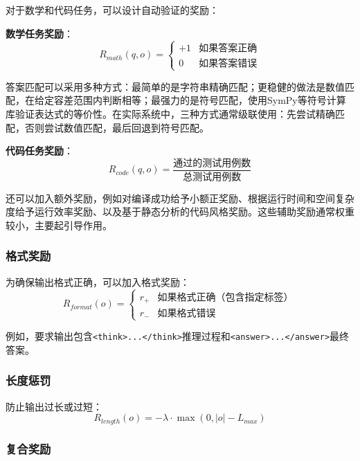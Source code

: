 \documentclass[12pt,a4paper]{article}
\begin{document}
对于数学和代码任务，可以设计自动验证的奖励：

\textbf{数学任务奖励}：
\begin{equation}
R_{math}(q, o) = \begin{cases}
+1 & \text{如果答案正确} \\
0 & \text{如果答案错误}
\end{cases}
\end{equation}

答案匹配可以采用多种方式：最简单的是字符串精确匹配；更稳健的做法是数值匹配，在给定容差范围内判断相等；最强力的是符号匹配，使用SymPy等符号计算库验证表达式的等价性。在实际系统中，三种方式通常级联使用：先尝试精确匹配，否则尝试数值匹配，最后回退到符号匹配。

\textbf{代码任务奖励}：
\begin{equation}
R_{code}(q, o) = \frac{\text{通过的测试用例数}}{\text{总测试用例数}}
\end{equation}

还可以加入额外奖励，例如对编译成功给予小额正奖励、根据运行时间和空间复杂度给予运行效率奖励、以及基于静态分析的代码风格奖励。这些辅助奖励通常权重较小，主要起引导作用。

\subsubsection{格式奖励}

为确保输出格式正确，可以加入格式奖励：
\begin{equation}
R_{format}(o) = \begin{cases}
r_+ & \text{如果格式正确（包含指定标签）} \\
r_- & \text{如果格式错误}
\end{cases}
\end{equation}

例如，要求输出包含\texttt{<think>...</think>}推理过程和\texttt{<answer>...</answer>}最终答案。

\subsubsection{长度惩罚}

防止输出过长或过短：
\begin{equation}
R_{length}(o) = -\lambda \cdot \max(0, |o| - L_{max})
\end{equation}

\subsubsection{复合奖励}
\end{document}

